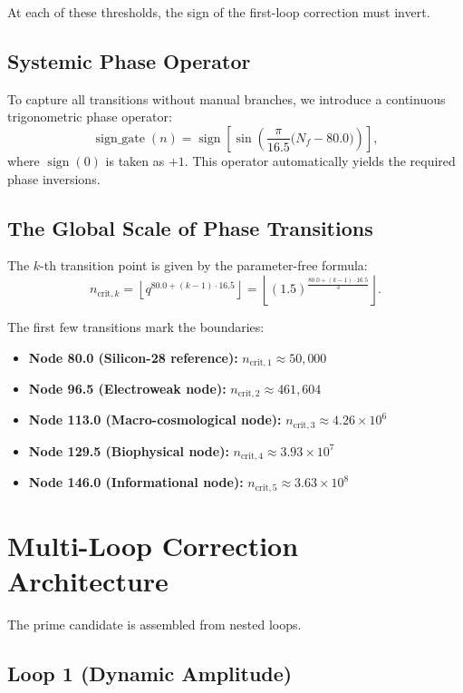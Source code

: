 \documentclass[12pt,a4paper]{article}
\theoremstyle{remark}
\begin{document}
	At each of these thresholds, the sign of the first-loop correction must invert.
	
	\subsection{Systemic Phase Operator}
	
	To capture all transitions without manual branches, we introduce a continuous trigonometric phase operator:
	\[
	\boxed{\operatorname{sign\_gate}(n) = \operatorname{sign}\left[\sin\left(\frac{\pi}{16.5}\bigl(N_f - 80.0\bigr)\right)\right]},
	\]
	where \(\operatorname{sign}(0)\) is taken as \(+1\). This operator automatically yields the required phase inversions.
	
	\subsection{The Global Scale of Phase Transitions}
	
	The \(k\)-th transition point is given by the parameter-free formula:
	\[
	n_{\mathrm{crit},k} = \left\lfloor q^{80.0 + (k-1)\cdot 16.5} \right\rfloor
	= \left\lfloor (1.5)^{\frac{80.0+(k-1)\cdot 16.5}{3}} \right\rfloor.
	\]
	
	The first few transitions mark the boundaries:
	\begin{itemize}
		\item \textbf{Node 80.0 (Silicon-28 reference):} \(n_{\mathrm{crit},1} \approx 50,000\)
		\item \textbf{Node 96.5 (Electroweak node):} \(n_{\mathrm{crit},2} \approx 461,604\)
		\item \textbf{Node 113.0 (Macro-cosmological node):} \(n_{\mathrm{crit},3} \approx 4.26\times10^6\)
		\item \textbf{Node 129.5 (Biophysical node):} \(n_{\mathrm{crit},4} \approx 3.93\times10^7\)
		\item \textbf{Node 146.0 (Informational node):} \(n_{\mathrm{crit},5} \approx 3.63\times10^8\)
	\end{itemize}
	
	\section{Multi-Loop Correction Architecture}
	
	The prime candidate is assembled from nested loops.
	
	\subsection{Loop 1 (Dynamic Amplitude)}
	
\end{document}
